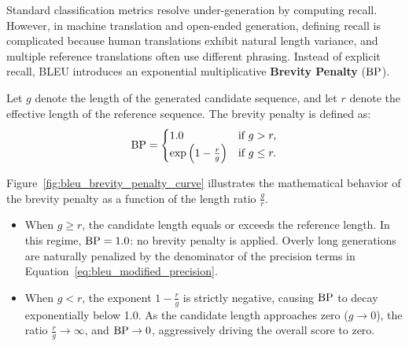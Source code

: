 \documentclass[../../main.tex]{subfiles}
\begin{document}
Standard classification metrics resolve under-generation by computing recall. However, in machine translation and open-ended generation, defining recall is complicated because human translations exhibit natural length variance, and multiple reference translations often use different phrasing. Instead of explicit recall, BLEU introduces an exponential multiplicative \textbf{Brevity Penalty} ($\mathrm{BP}$).

Let $g$ denote the length of the generated candidate sequence, and let $r$ denote the effective length of the reference sequence. The brevity penalty is defined as:
\begin{equation}
\label{eq:brevity_penalty_def}
\mathrm{BP} = \begin{cases} 
1.0 & \text{if } g > r, \\
\exp\left( 1 - \frac{r}{g} \right) & \text{if } g \le r.
\end{cases}
\end{equation}

Figure~\ref{fig:bleu_brevity_penalty_curve} illustrates the mathematical behavior of the brevity penalty as a function of the length ratio $\frac{g}{r}$.
\begin{itemize}
    \item When $g \ge r$, the candidate length equals or exceeds the reference length. In this regime, $\mathrm{BP} = 1.0$: no brevity penalty is applied. Overly long generations are naturally penalized by the denominator of the precision terms in Equation~\eqref{eq:bleu_modified_precision}.
    \item When $g < r$, the exponent $1 - \frac{r}{g}$ is strictly negative, causing $\mathrm{BP}$ to decay exponentially below 1.0. As the candidate length approaches zero ($g \to 0$), the ratio $\frac{r}{g} \to \infty$, and $\mathrm{BP} \to 0$, aggressively driving the overall score to zero.
\end{itemize}
\end{document}
